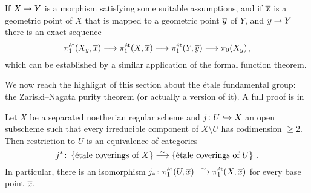 \begin{rem}
	If $X\morphism Y$ is a morphism satisfying some suitable assumptions, and if $\ov{x}$ is a geometric point of $X$ that is mapped to a geometric point $\ov{y}$ of $Y$, and $y\morphism Y$ there is an exact sequence
	\begin{equation*}
		\pi_1^\et(X_y,\ov{x})\morphism\pi_1^\et(X,\ov{x})\morphism\pi_1^\et(Y,\ov{y})\morphism\pi_0(X_y)\,,
	\end{equation*}
	which can be established by a similar application of the formal function theorem.
\end{rem}
We now reach the highlight of this section about the étale fundamental group: the Zariski--Nagata purity theorem (or actually a version of it). A full proof is in \cite[Exposé~X Corollaire~3.3]{sga1}
\begin{thm}\label{thm:Zariski-Nagata}
	Let $X$ be a separated noetherian regular scheme and $j\colon U\monomorphism X$ an open subscheme such that every irreducible component of $X\setminus U$ has codimension $\geq 2$. Then restriction to $U$ is an equivalence of categories
	\begin{equation*}
		j^*\colon\left\{\text{étale coverings of $X$}\right\}\isomorphism\left\{\text{étale coverings of $U$}\right\}\,.
	\end{equation*}
	In particular, there is an isomorphism $j_*\colon \pi_1^\et(U,\ov{x})\isomorphism \pi_1^\et(X,\ov{x})$ for every base point $\ov{x}$.
\end{thm}
